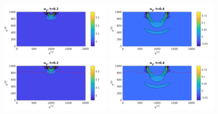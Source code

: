 
\begin{figure}[htbp]
	\centering
	\includegraphics[width=0.49\textwidth,trim={0.05cm 0.1cm 0.55cm 0.45cm}, clip]{u3_t02_cartesian.png}
	\includegraphics[width=0.49\textwidth,trim={0.05cm 0.1cm 0.55cm 0.45cm}, clip]{u3_t04_cartesian.png}\\
	\includegraphics[width=0.49\textwidth,trim={0.05cm 0.1cm 0.55cm 0.45cm}, clip]{u3_t02_curvi.png}
	\includegraphics[width=0.49\textwidth,trim={0.05cm 0.1cm 0.55cm 0.45cm}, clip]{u3_t04_curvi.png}\\

\end{figure}
